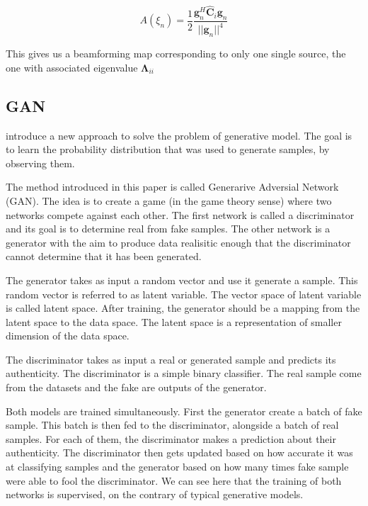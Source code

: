 \documentclass{article}
\begin{document}
\begin{equation}
    A(\xi_n) = \frac{1}{2} \frac{\mathbf{g}_{n}^H \hat{\mathbf{C}}_i \mathbf{g}_{n}}{||\mathbf{g}_{n}||^4}
\end{equation}

This gives us a beamforming map corresponding to only one single source, the one with associated eigenvalue $\mathbf{\Lambda}_{ii}$



\subsection{GAN}

\cite{goodfellow2020generative} introduce a new approach to solve the problem of generative model. The goal is to learn the probability distribution that was used to generate samples, by observing them.

The method introduced in this paper is called Generarive Adversial Network (GAN). The idea is to create a game (in the game theory sense) where two networks compete against each other. The first network is called a discriminator and its goal is to determine real from fake samples. The other network is a  generator with the aim to produce data realisitic enough that the discriminator cannot determine that it has been generated.

The generator takes as input a random vector and use it generate a sample. This random vector is referred to as latent variable. The vector space of latent variable is called latent space. After training, the generator should be a mapping from the latent space to the data space. The latent space is  a representation of smaller dimension of the data space.

The discriminator takes as input a real or generated sample and predicts its authenticity. The discriminator is a simple binary classifier. The real sample come from the datasets and the fake are outputs of the generator.

Both models are trained simultaneously. First the generator create a batch of fake sample. This batch is then fed to the discriminator, alongside a batch of real samples. For each of them, the discriminator makes a prediction about their authenticity. The discriminator then gets updated based on how accurate it was at classifying samples and the generator based on how many times fake sample were able to fool the discriminator. We can see here that the training of both networks is supervised, on the contrary of typical generative models.
\end{document}
